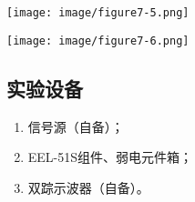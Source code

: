 \documentclass[UTF8]{article}
\begin{document}
            \begin{adjustwidth}{0em}{0em}
                \begin{minipage}[H]{0.45\textwidth}
                    \centering
                    \texttt{[image: image/figure7-5.png]}
                \end{minipage}
                \hfill
                \begin{minipage}[H]{0.45\textwidth}
                    \centering
                    \texttt{[image: image/figure7-6.png]}
                \end{minipage}
            \end{adjustwidth}
        \subsection{实验设备}
            \begin{enumerate}[label=\textbf{\arabic*}.]
                \item 信号源（自备）；
                \item EEL-51S组件、弱电元件箱； 
                \item 双踪示波器（自备）。
            \end{enumerate}
\end{document}
